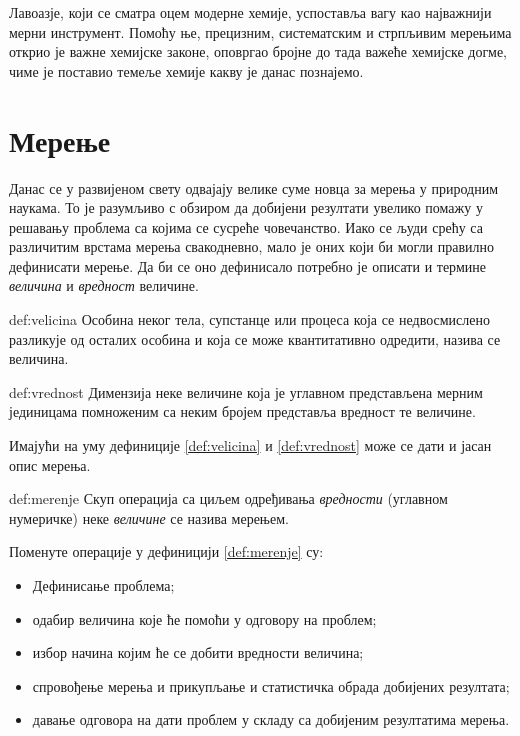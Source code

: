 Лавоазје, који се сматра оцем модерне хемије, успоставља вагу као
најважнији мерни инструмент. Помоћу ње, прецизним, систематским и
стрпљивим мерењима открио је важне хемијске законе, оповргао бројне
до тада важеће хемијске догме, чиме је поставио темеље хемије какву
је данас познајемо. 


\section{Мерење}

Данас се у развијеном свету одвајају велике суме новца за мерења
у природним наукама. То је разумљиво с обзиром да добијени резултати
увелико помажу у решавању проблема са којима се сусреће човечанство.
Иако се људи срећу са различитим врстама мерења свакодневно, мало
је оних који би могли правилно дефинисати мерење. Да би се оно
дефинисало потребно је описати и термине \emph{величина} и
\emph{вредност} величине.

\begin{df}[Величина]{def:velicina}
  Особина неког тела, супстанце или процеса која се недвосмислено
  разликује од осталих особина и која се може квантитативно одредити,
  назива се величина.
\end{df}

\begin{df}[Вредност]{def:vrednost}
  Димензија неке величине која је углавном представљена мерним јединицама
  помноженим са неким бројем представља вредност те величине.
\end{df}

Имајући на уму дефиниције \ref{def:velicina} и \ref{def:vrednost} може
се дати и јасан опис мерења.

\begin{df}[Мерење]{def:merenje}
  Скуп операција са циљем одређивања \emph{вредности} (углавном
  нумеричке) неке \emph{величине} се назива мерењем.
\end{df}
Поменуте операције у дефиницији \ref{def:merenje} су:
\begin{itemize}[label={$\RHD$}]
\item Дефинисање проблема;
\item одабир величина које ће помоћи у одговору на проблем;
\item избор начина којим ће се добити вредности величина;
\item спровођење мерења и прикупљање и статистичка обрада
добијених резултата;
\item давање одговора на дати проблем у складу са добијеним
резултатима мерења.
\end{itemize}

